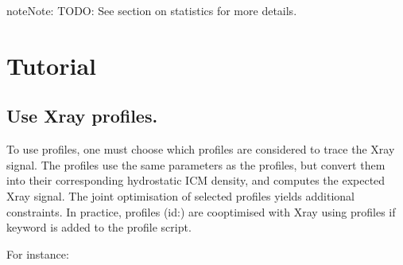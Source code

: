 \documentclass[letterpaper,10pt,english]{sphinxmanual}
\begin{document}
\begin{sphinxadmonition}{note}{Note:}
\sphinxAtStartPar
TODO: See section on statistics for more details.
\end{sphinxadmonition}


\section{Tutorial}
\label{\detokenize{tutorial:tutorial}}\label{\detokenize{tutorial::doc}}

\subsection{Use  X\sphinxhyphen{}ray profiles.}
\label{\detokenize{tutorial:use-idpie-x-ray-profiles}}\label{\detokenize{tutorial:idpie-tutorial}}
\sphinxAtStartPar
To use  profiles, one must choose which  profiles are considered to trace the X\sphinxhyphen{}ray signal.
The  profiles use the same parameters as the  profiles, but convert them into their corresponding hydrostatic ICM density, and computes the expected X\sphinxhyphen{}ray signal. The joint optimisation of selected profiles yields additional constraints.
In practice,  profiles (id:) are co\sphinxhyphen{}optimised with X\sphinxhyphen{}ray using  profiles if keyword  is added to the profile script.

\sphinxAtStartPar
For instance:

\begin{sphinxVerbatim}[commandchars=\\\{\}]
\end{sphinxVerbatim}
\end{document}
